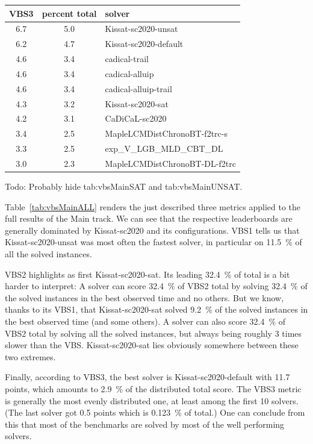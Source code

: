\documentclass{elsarticle}
\newcommand{\todo}[1]{{\color{purple}Todo: #1}}
\begin{document}
\begin{table}
\begin{center}
\end{center}
\begin{center}
\begin{tabular}{ccl}
VBS3 & percent total & solver \\
\hline
6.7 & 5.0 & Kissat-sc2020-unsat \\
6.2 & 4.7 & Kissat-sc2020-default \\
4.6 & 3.4 & cadical-trail \\
4.6 & 3.4 & cadical-alluip \\
4.6 & 3.4 & cadical-alluip-trail \\
4.3 & 3.2 & Kissat-sc2020-sat \\
4.2 & 3.1 & CaDiCaL-sc2020 \\
3.4 & 2.5 & MapleLCMDistChronoBT-f2trc-s \\
3.3 & 2.5 & exp\_V\_LGB\_MLD\_CBT\_DL \\
3.0 & 2.3 & MapleLCMDistChronoBT-DL-f2trc \\
\end{tabular}
\end{center}
\end{table}

\todo{Probably hide tab:vbsMainSAT and tab:vbsMainUNSAT.} 

Table~\ref{tab:vbsMainALL} renders the just described three metrics applied 
to the full results of the Main track. We can see that the respective leaderboards 
are generally dominated by Kissat-sc2020 and its configurations.
VBS1 tells us that Kissat-sc2020-unsat was most often the fastest solver,
in particular on \SI{11.5}{\percent} of all the solved instances.

VBS2 highlights as first Kissat-sc2020-sat. Its leading \SI{32.4}{\percent} of total is a bit harder to 
interpret: A solver can score \SI{32.4}{\percent} of VBS2 total
by solving \SI{32.4}{\percent} of the solved instances in the best observed time
and no others. But we know, thanks to its VBS1, that Kissat-sc2020-sat solved \SI{9.2}{\percent}
of the solved instances in the best observed time (and some others).
A solver can also score \SI{32.4}{\percent} of VBS2 total by solving all the solved instances,
but always being roughly 3 times slower than the VBS. 
Kissat-sc2020-sat lies obviously somewhere between these two extremes.

Finally, according to VBS3, the best solver is Kissat-sc2020-default with 11.7 points,
which amounts to \SI{2.9}{\percent} of the distributed total score.
The VBS3 metric is generally the most evenly distributed one,
at least among the first 10 solvers.
(The last solver got 0.5 points which is \SI{0.123}{\percent} of total.)
One can conclude from this that most of the benchmarks are solved
by most of the well performing solvers. 
\end{document}
